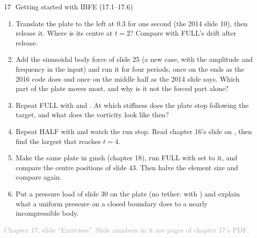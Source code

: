 \documentclass[aspectratio=169,11pt]{beamer}
\newcommand{\sourcecredit}[1]{\vfill\begin{flushright}\tiny\textcolor{DarkGray}{#1}\end{flushright}}
\begin{document}
\begin{frame}{17\,\textbullet\ Getting started with IBFE (17.1--17.6)}
\label{fr:c17x1}
\footnotesize
\begin{enumerate}
  \item[17.1] Translate the plate to the left at $0.3$ for one second (the 2014 slide 10), then release it. Where is its centre at $t = 2$? Compare with FULL's drift after release.
  \item[17.2] Add the sinusoidal body force of slide 25 (a new  case, with the amplitude and frequency in the input) and run it for four periods, once on the ends as the 2016 code does and once on the middle half as the 2014 slide says. Which part of the plate moves most, and why is it not the forced part alone?
  \item[17.3] Repeat FULL with  and . At which stiffness does the plate stop following the target, and what does the vorticity look like then?
  \item[17.4] Repeat HALF with  and watch the run stop. Read chapter 16's slide on , then find the largest  that reaches $t = 4$.
  \item[17.5] Make the same plate in gmsh (chapter 18), run FULL with  set to it, and compare the centre positions of slide 43. Then halve the element size and compare again.
  \item[17.6] Put a pressure load of slide 30 on the plate (no tether:  with ) and explain what a uniform pressure on a closed boundary does to a nearly incompressible body.
\end{enumerate}
\sourcecredit{Chapter 17, slide ``Exercises''. Slide numbers in it are pages of chapter 17's PDF.}
\end{frame}
\end{document}
